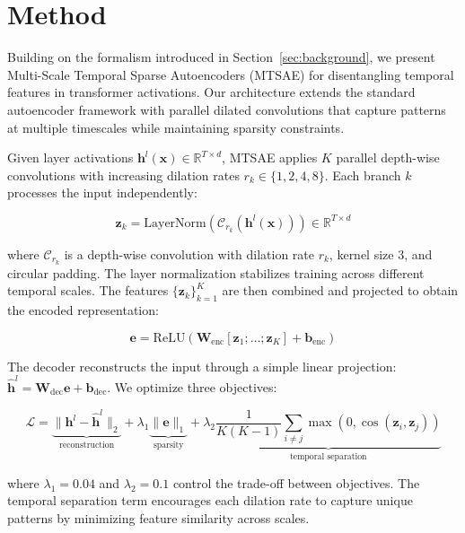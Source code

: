 \documentclass{article} %
\begin{document}
\section{Method}
\label{sec:method}

Building on the formalism introduced in Section~\ref{sec:background}, we present Multi-Scale Temporal Sparse Autoencoders (MTSAE) for disentangling temporal features in transformer activations. Our architecture extends the standard autoencoder framework with parallel dilated convolutions that capture patterns at multiple timescales while maintaining sparsity constraints.

Given layer activations $\mathbf{h}^l(\mathbf{x}) \in \mathbb{R}^{T \times d}$, MTSAE applies $K$ parallel depth-wise convolutions with increasing dilation rates $r_k \in \{1,2,4,8\}$. Each branch $k$ processes the input independently:

\begin{equation}
    \mathbf{z}_k = \text{LayerNorm}(\mathcal{C}_{r_k}(\mathbf{h}^l(\mathbf{x}))) \in \mathbb{R}^{T \times d}
\end{equation}

where $\mathcal{C}_{r_k}$ is a depth-wise convolution with dilation rate $r_k$, kernel size 3, and circular padding. The layer normalization stabilizes training across different temporal scales. The features $\{\mathbf{z}_k\}_{k=1}^{K}$ are then combined and projected to obtain the encoded representation:

\begin{equation}
    \mathbf{e} = \text{ReLU}(\mathbf{W}_\text{enc}[\mathbf{z}_1; \ldots; \mathbf{z}_K] + \mathbf{b}_\text{enc})
\end{equation}

The decoder reconstructs the input through a simple linear projection: $\hat{\mathbf{h}}^l = \mathbf{W}_\text{dec}\mathbf{e} + \mathbf{b}_\text{dec}$. We optimize three objectives:

\begin{equation}
    \mathcal{L} = \underbrace{\|\mathbf{h}^l - \hat{\mathbf{h}}^l\|_2}_{\text{reconstruction}} + \lambda_1 \underbrace{\|\mathbf{e}\|_1}_{\text{sparsity}} + \lambda_2 \underbrace{\frac{1}{K(K-1)}\sum_{i\neq j}\max(0, \cos(\mathbf{z}_i, \mathbf{z}_j))}_{\text{temporal separation}}
\end{equation}

where $\lambda_1=0.04$ and $\lambda_2=0.1$ control the trade-off between objectives. The temporal separation term encourages each dilation rate to capture unique patterns by minimizing feature similarity across scales.
\end{document}
